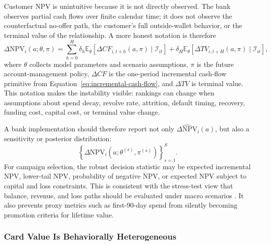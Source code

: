 \documentclass[11pt]{article}
\newcommand{\E}{\mathbb{E}}
\newcommand{\NPV}{\mathrm{NPV}}
\newcommand{\1}{\mathbf{1}}
\begin{document}
Customer NPV is unintuitive because it is not directly observed. The bank
observes partial cash flows over finite calendar time; it does not observe the
counterfactual no-offer path, the customer's full outside-wallet behavior, or
the terminal value of the relationship. A more honest notation is therefore
\begin{equation}
  \Delta \NPV_i(a;\theta,\pi)
  =
  \sum_{h=0}^{H}
  \delta_h
  \E_\theta[
    \Delta CF_{i,t+h}(a,\pi)
    \mid \mathcal{I}_{it}
  ]
  +
  \delta_H
  \E_\theta[
    \Delta TV_{i,t+H}(a,\pi)
    \mid \mathcal{I}_{it}
  ],
  \label{eq:npv-theta-policy}
\end{equation}
where $\theta$ collects model parameters and scenario assumptions, $\pi$ is the
future account-management policy, $\Delta CF$ is the one-period incremental
cash-flow primitive from Equation~\eqref{eq:incremental-cash-flow}, and
$\Delta TV$ is terminal value. This notation makes the instability visible:
rankings can change when assumptions about spend decay, revolve rate,
attrition, default timing, recovery, funding cost, capital cost, or terminal
value change.

A bank implementation should therefore report not only
$\widehat{\Delta \NPV}_i(a)$, but also a sensitivity or posterior distribution:
\begin{equation}
  \left\{
    \Delta \NPV_i(a;\theta^{(s)},\pi^{(s)})
  \right\}_{s=1}^{S}.
  \label{eq:npv-sensitivity-draws}
\end{equation}
For campaign selection, the robust decision statistic may be expected
incremental NPV, lower-tail NPV, probability of negative NPV, or expected NPV
subject to capital and loss constraints. This is consistent with the stress-test
view that balance, revenue, and loss paths should be evaluated under macro
scenarios \citep{federalreserve2025stressmethodology,federalreserve2026stressmethodology}.
It also prevents proxy metrics such as first-90-day spend from silently becoming
promotion criteria for lifetime value.

\subsubsection{Card Value Is Behaviorally Heterogeneous}
\label{subsec:behavioral-heterogeneity}
\end{document}
